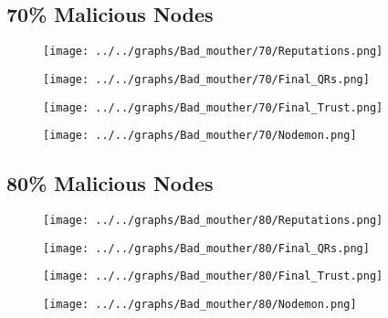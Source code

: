 \begin{minipage}[t]{0.49\columnwidth}
\subsection*{70\% Malicious Nodes}
    \begin{figure}[H]
        \centering
        \texttt{[image: ../../graphs/Bad\_mouther/70/Reputations.png]}
    \end{figure}
    \begin{figure}[H]
        \centering
        \texttt{[image: ../../graphs/Bad\_mouther/70/Final\_QRs.png]}
    \end{figure}
\end{minipage}
\begin{minipage}[t]{0.49\columnwidth}
    \begin{figure}[H]
        \centering
        \texttt{[image: ../../graphs/Bad\_mouther/70/Final\_Trust.png]}
    \end{figure}
    \begin{figure}[H]
        \centering
        \texttt{[image: ../../graphs/Bad\_mouther/70/Nodemon.png]}
    \end{figure}
\end{minipage}

\begin{minipage}[t]{0.49\columnwidth}
\subsection*{80\% Malicious Nodes}
    \begin{figure}[H]
        \centering
        \texttt{[image: ../../graphs/Bad\_mouther/80/Reputations.png]}
    \end{figure}
    \begin{figure}[H]
        \centering
        \texttt{[image: ../../graphs/Bad\_mouther/80/Final\_QRs.png]}
    \end{figure}
\end{minipage}
\begin{minipage}[t]{0.49\columnwidth}
    \begin{figure}[H]
        \centering
        \texttt{[image: ../../graphs/Bad\_mouther/80/Final\_Trust.png]}
    \end{figure}
    \begin{figure}[H]
        \centering
        \texttt{[image: ../../graphs/Bad\_mouther/80/Nodemon.png]}
    \end{figure}
\end{minipage}

